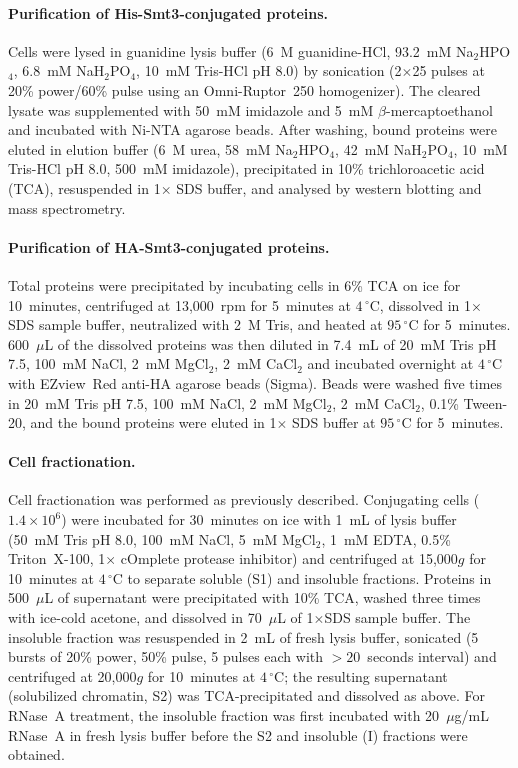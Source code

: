 \documentclass[11pt]{article}
\begin{document}
\paragraph{Purification of His-Smt3-conjugated proteins.}
Cells were lysed in guanidine lysis buffer (6~M guanidine-HCl, 93.2~mM
Na$_2$HPO$_4$, 6.8~mM NaH$_2$PO$_4$, 10~mM Tris-HCl pH 8.0) by
sonication (2$\times$25 pulses at 20\% power/60\% pulse using an
Omni-Ruptor~250 homogenizer). The cleared lysate was supplemented with
50~mM imidazole and 5~mM $\beta$-mercaptoethanol and incubated with
Ni-NTA agarose beads. After washing, bound proteins were eluted in
elution buffer (6~M urea, 58~mM Na$_2$HPO$_4$, 42~mM NaH$_2$PO$_4$,
10~mM Tris-HCl pH 8.0, 500~mM imidazole), precipitated in 10\%
trichloroacetic acid (TCA), resuspended in 1$\times$ SDS buffer, and
analysed by western blotting and mass spectrometry.

\paragraph{Purification of HA-Smt3-conjugated proteins.}
Total proteins were precipitated by incubating cells in 6\% TCA on ice
for 10~minutes, centrifuged at 13{,}000~rpm for 5~minutes at
$4\,^{\circ}$C, dissolved in 1$\times$ SDS sample buffer, neutralized
with 2~M Tris, and heated at $95\,^{\circ}$C for 5~minutes. 600~$\mu$L
of the dissolved proteins was then diluted in 7.4~mL of 20~mM Tris
pH 7.5, 100~mM NaCl, 2~mM MgCl$_2$, 2~mM CaCl$_2$ and incubated overnight
at $4\,^{\circ}$C with EZview~Red anti-HA agarose beads (Sigma). Beads
were washed five times in 20~mM Tris pH 7.5, 100~mM NaCl, 2~mM MgCl$_2$,
2~mM CaCl$_2$, 0.1\% Tween-20, and the bound proteins were eluted in
1$\times$ SDS buffer at $95\,^{\circ}$C for 5~minutes.

\paragraph{Cell fractionation.}
Cell fractionation was performed as previously described. Conjugating
cells ($1.4\times10^{6}$) were incubated for 30~minutes on ice with
1~mL of lysis buffer (50~mM Tris pH 8.0, 100~mM NaCl, 5~mM MgCl$_2$,
1~mM EDTA, 0.5\% Triton~X-100, 1$\times$ cOmplete protease inhibitor)
and centrifuged at 15{,}000$g$ for 10~minutes at $4\,^{\circ}$C to
separate soluble (S1) and insoluble fractions. Proteins in 500~$\mu$L
of supernatant were precipitated with 10\% TCA, washed three times with
ice-cold acetone, and dissolved in 70~$\mu$L of 1$\times$SDS sample
buffer. The insoluble fraction was resuspended in 2~mL of fresh lysis
buffer, sonicated (5 bursts of 20\% power, 50\% pulse, 5 pulses each
with $>20$~seconds interval) and centrifuged at 20{,}000$g$ for
10~minutes at $4\,^{\circ}$C; the resulting supernatant (solubilized
chromatin, S2) was TCA-precipitated and dissolved as above. For RNase~A
treatment, the insoluble fraction was first incubated with 20~$\mu$g/mL
RNase~A in fresh lysis buffer before the S2 and insoluble (I) fractions
were obtained.
\end{document}
